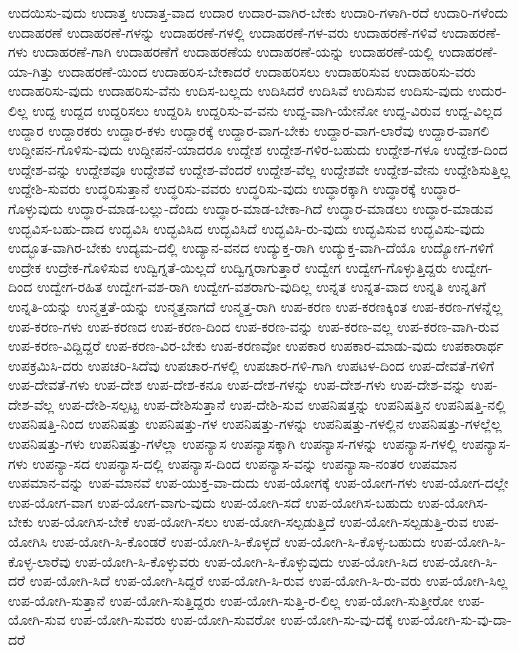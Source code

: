 {ಉದಯಿಸು-ವುದು
ಉದಾತ್ತ
ಉದಾತ್ತ-ವಾದ
ಉದಾರ
ಉದಾರ-ವಾಗಿರ-ಬೇಕು
ಉದಾರಿ-ಗಳಾಗಿ-ರದೆ
ಉದಾರಿ-ಗಳೆಂದು
ಉದಾಹರಣೆ
ಉದಾಹರಣೆ-ಗಳನ್ನು
ಉದಾಹರಣೆ-ಗಳಲ್ಲಿ
ಉದಾಹರಣೆ-ಗಳ-ವರು
ಉದಾಹರಣೆ-ಗಳಿವೆ
ಉದಾಹರಣೆ-ಗಳು
ಉದಾಹರಣೆ-ಗಾಗಿ
ಉದಾಹರಣೆಗೆ
ಉದಾಹರಣೆಯ
ಉದಾಹರಣೆ-ಯನ್ನು
ಉದಾಹರಣೆ-ಯಲ್ಲಿ
ಉದಾಹರಣೆ-ಯಾ-ಗಿತ್ತು
ಉದಾಹರಣೆ-ಯಿಂದ
ಉದಾಹರಿಸ-ಬೇಕಾದರೆ
ಉದಾಹರಿಸಲು
ಉದಾಹರಿಸುವ
ಉದಾಹರಿಸು-ವರು
ಉದಾಹರಿಸು-ವುದು
ಉದಾಹರಿಸು-ವೆನು
ಉದಿಸ-ಬಲ್ಲದು
ಉದಿಸಿದರೆ
ಉದಿಸಿವೆ
ಉದಿಸುವ
ಉದಿಸು-ವುದು
ಉದುರ-ಲಿಲ್ಲ
ಉದ್ದ
ಉದ್ದದ
ಉದ್ದರಿಸಲು
ಉದ್ದರಿಸಿ
ಉದ್ದರಿಸು-ವ-ವನು
ಉದ್ದ-ವಾಗಿ-ಯೇನೋ
ಉದ್ದ-ವಿರುವ
ಉದ್ದ-ವಿಲ್ಲದ
ಉದ್ದಾರ
ಉದ್ದಾರಕರು
ಉದ್ದಾರ-ಕಳು
ಉದ್ದಾರಕ್ಕೆ
ಉದ್ದಾರ-ವಾಗ-ಬೇಕು
ಉದ್ದಾರ-ವಾಗ-ಲಾರೆವು
ಉದ್ದಾರ-ವಾಗಲಿ
ಉದ್ದೀಪನ-ಗೊಳಿಸು-ವುದು
ಉದ್ದೀಪನೆ-ಯಾದರೂ
ಉದ್ದೇಶ
ಉದ್ದೇಶ-ಗಳಿರ-ಬಹುದು
ಉದ್ದೇಶ-ಗಳೂ
ಉದ್ದೇಶ-ದಿಂದ
ಉದ್ದೇಶ-ವನ್ನು
ಉದ್ದೇಶವೂ
ಉದ್ದೇಶವೆ
ಉದ್ದೇಶ-ವೆಂದರೆ
ಉದ್ದೇಶ-ವೆಲ್ಲ
ಉದ್ದೇಶವೇ
ಉದ್ದೇಶ-ವೇನು
ಉದ್ದೇಶಿಸುತ್ತಿಲ್ಲ
ಉದ್ದೇಶಿ-ಸುವರು
ಉದ್ಧರಿಸುತ್ತಾನೆ
ಉದ್ಧರಿಸು-ವವರು
ಉದ್ಧರಿಸು-ವುದು
ಉದ್ಧಾರಕ್ಕಾಗಿ
ಉದ್ಧಾರಕ್ಕೆ
ಉದ್ಧಾರ-ಗೊಳ್ಳುವುದು
ಉದ್ಧಾರ-ಮಾಡ-ಬಲ್ಲು-ದೆಂದು
ಉದ್ಧಾರ-ಮಾಡ-ಬೇಕಾ-ಗಿದೆ
ಉದ್ಧಾರ-ಮಾಡಲು
ಉದ್ಧಾರ-ಮಾಡುವ
ಉದ್ಭವಿಸ-ಬಹು-ದಾದ
ಉದ್ಭವಿಸಿ
ಉದ್ಭವಿಸಿದ
ಉದ್ಭವಿಸಿದೆ
ಉದ್ಭವಿಸಿ-ರು-ವುದು
ಉದ್ಭವಿಸುವ
ಉದ್ಭವಿಸು-ವುದು
ಉದ್ಭೂತ-ವಾಗಿರ-ಬೇಕು
ಉದ್ಯಮ-ದಲ್ಲಿ
ಉದ್ಯಾನ-ವನದ
ಉದ್ಯುಕ್ತ-ರಾಗಿ
ಉದ್ಯುಕ್ತ-ವಾಗಿ-ದೆಯೊ
ಉದ್ಯೋಗ-ಗಳಿಗೆ
ಉದ್ರೇಕ
ಉದ್ರೇಕ-ಗೊಳಿಸುವ
ಉದ್ವಿಗ್ನತೆ-ಯಿಲ್ಲದೆ
ಉದ್ವಿಗ್ನರಾಗುತ್ತಾರೆ
ಉದ್ವೇಗ
ಉದ್ವೇಗ-ಗೊಳ್ಳುತ್ತಿದ್ದರು
ಉದ್ವೇಗ-ದಿಂದ
ಉದ್ವೇಗ-ರಹಿತ
ಉದ್ವೇಗ-ವಶ-ರಾಗಿ
ಉದ್ವೇಗ-ವಶರಾಗು-ವುದಿಲ್ಲ
ಉನ್ನತ
ಉನ್ನತ-ವಾದ
ಉನ್ನತಿ
ಉನ್ನತಿಗೆ
ಉನ್ನತಿ-ಯನ್ನು
ಉನ್ಮತ್ತತೆ-ಯನ್ನು
ಉನ್ಮತ್ತನಾಗದೆ
ಉನ್ಮತ್ತ-ರಾಗಿ
ಉಪ-ಕರಣ
ಉಪ-ಕರಣಕ್ಕಿಂತ
ಉಪ-ಕರಣ-ಗಳನ್ನೆಲ್ಲ
ಉಪ-ಕರಣ-ಗಳು
ಉಪ-ಕರಣದ
ಉಪ-ಕರಣ-ದಿಂದ
ಉಪ-ಕರಣ-ವನ್ನು
ಉಪ-ಕರಣ-ವಲ್ಲ
ಉಪ-ಕರಣ-ವಾಗಿ-ರುವ
ಉಪ-ಕರಣ-ವಿದ್ದಿದ್ದರೆ
ಉಪ-ಕರಣ-ವಿರ-ಬೇಕು
ಉಪ-ಕರಣವೋ
ಉಪಕಾರ
ಉಪಕಾರ-ಮಾಡು-ವುದು
ಉಪಕಾರಾರ್ಥ
ಉಪಕ್ರಮಿಸಿ-ದರು
ಉಪಚರಿ-ಸಿದೆವು
ಉಪಚಾರ-ಗಳಲ್ಲಿ
ಉಪಚಾರ-ಗಳಿ-ಗಾಗಿ
ಉಪಟಳ-ದಿಂದ
ಉಪ-ದೇವತೆ-ಗಳಿಗೆ
ಉಪ-ದೇವತೆ-ಗಳು
ಉಪ-ದೇಶ
ಉಪ-ದೇಶ-ಕನೂ
ಉಪ-ದೇಶ-ಗಳನ್ನು
ಉಪ-ದೇಶ-ಗಳು
ಉಪ-ದೇಶ-ವನ್ನು
ಉಪ-ದೇಶ-ವೆಲ್ಲ
ಉಪ-ದೇಶಿ-ಸಲ್ಪಟ್ಟ
ಉಪ-ದೇಶಿಸುತ್ತಾನೆ
ಉಪ-ದೇಶಿ-ಸುವ
ಉಪನಿಷತ್ತನ್ನು
ಉಪನಿಷತ್ತಿನ
ಉಪನಿಷತ್ತಿ-ನಲ್ಲಿ
ಉಪನಿಷತ್ತಿ-ನಿಂದ
ಉಪನಿಷತ್ತು
ಉಪನಿಷತ್ತು-ಗಳ
ಉಪನಿಷತ್ತು-ಗಳನ್ನು
ಉಪನಿಷತ್ತು-ಗಳಲ್ಲಿನ
ಉಪನಿಷತ್ತು-ಗಳಲ್ಲೆಲ್ಲ
ಉಪನಿಷತ್ತು-ಗಳು
ಉಪನಿಷತ್ತು-ಗಳೆಲ್ಲಾ
ಉಪನ್ಯಾಸ
ಉಪನ್ಯಾಸಕ್ಕಾಗಿ
ಉಪನ್ಯಾಸ-ಗಳನ್ನು
ಉಪನ್ಯಾಸ-ಗಳಲ್ಲಿ
ಉಪನ್ಯಾಸ-ಗಳು
ಉಪನ್ಯಾ-ಸದ
ಉಪನ್ಯಾಸ-ದಲ್ಲಿ
ಉಪನ್ಯಾಸ-ದಿಂದ
ಉಪನ್ಯಾಸ-ವನ್ನು
ಉಪನ್ಯಾಸಾ-ನಂತರ
ಉಪಮಾನ
ಉಪಮಾನ-ವನ್ನು
ಉಪ-ಮಾನವೆ
ಉಪ-ಯುಕ್ತ-ವಾ-ದುದು
ಉಪ-ಯೋಗಕ್ಕೆ
ಉಪ-ಯೋಗ-ಗಳು
ಉಪ-ಯೋಗ-ದಲ್ಲೇ
ಉಪ-ಯೋಗ-ವಾಗ
ಉಪ-ಯೋಗ-ವಾಗು-ವುದು
ಉಪ-ಯೋಗಿ-ಸದೆ
ಉಪ-ಯೋಗಿಸ-ಬಹುದು
ಉಪ-ಯೋಗಿಸ-ಬೇಕು
ಉಪ-ಯೋಗಿಸ-ಬೇಕೆ
ಉಪ-ಯೋಗಿ-ಸಲು
ಉಪ-ಯೋಗಿ-ಸಲ್ಪಡುತ್ತಿದೆ
ಉಪ-ಯೋಗಿ-ಸಲ್ಪಡುತ್ತಿ-ರುವ
ಉಪ-ಯೋಗಿಸಿ
ಉಪ-ಯೋಗಿ-ಸಿ-ಕೊಂಡರೆ
ಉಪ-ಯೋಗಿ-ಸಿ-ಕೊಳ್ಳದೆ
ಉಪ-ಯೋಗಿ-ಸಿ-ಕೊಳ್ಳ-ಬಹುದು
ಉಪ-ಯೋಗಿ-ಸಿ-ಕೊಳ್ಳ-ಲಾರೆವು
ಉಪ-ಯೋಗಿ-ಸಿ-ಕೊಳ್ಳುವರು
ಉಪ-ಯೋಗಿ-ಸಿ-ಕೊಳ್ಳುವುದು
ಉಪ-ಯೋಗಿ-ಸಿದ
ಉಪ-ಯೋಗಿ-ಸಿ-ದರೆ
ಉಪ-ಯೋಗಿ-ಸಿದೆ
ಉಪ-ಯೋಗಿ-ಸಿದ್ದರೆ
ಉಪ-ಯೋಗಿ-ಸಿ-ರುವ
ಉಪ-ಯೋಗಿ-ಸಿ-ರು-ವರು
ಉಪ-ಯೋಗಿ-ಸಿಲ್ಲ
ಉಪ-ಯೋಗಿ-ಸುತ್ತಾನೆ
ಉಪ-ಯೋಗಿ-ಸುತ್ತಿದ್ದರು
ಉಪ-ಯೋಗಿ-ಸುತ್ತಿ-ರ-ಲಿಲ್ಲ
ಉಪ-ಯೋಗಿ-ಸುತ್ತೀರೋ
ಉಪ-ಯೋಗಿ-ಸುವ
ಉಪ-ಯೋಗಿ-ಸುವರು
ಉಪ-ಯೋಗಿ-ಸುವರೋ
ಉಪ-ಯೋಗಿ-ಸು-ವು-ದಕ್ಕೆ
ಉಪ-ಯೋಗಿ-ಸು-ವು-ದಾ-ದರೆ
}
